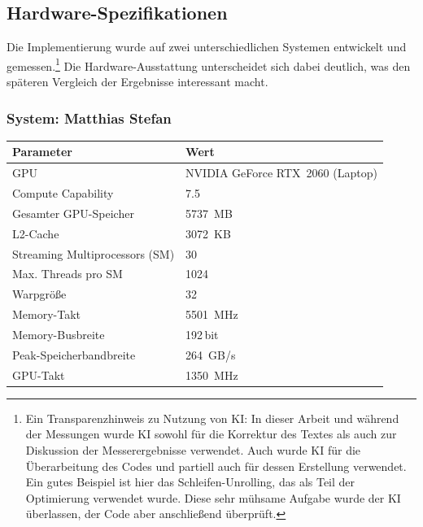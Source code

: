 \subsection{Hardware-Spezifikationen}
\label{subsec:heardware-spezifikationen}

Die Implementierung wurde auf zwei unterschiedlichen Systemen entwickelt und
gemessen.\footnote{Ein Transparenzhinweis zu Nutzung von KI: In dieser Arbeit und während der Messungen wurde KI sowohl für die Korrektur des Textes als auch zur Diskussion der Messerergebnisse verwendet. Auch wurde KI für die Überarbeitung des Codes und partiell auch für dessen Erstellung verwendet. Ein gutes Beispiel ist hier das Schleifen-Unrolling, das als Teil der Optimierung verwendet wurde. Diese sehr mühsame Aufgabe wurde der KI überlassen, der Code aber anschließend überprüft.} Die Hardware-Ausstattung unterscheidet sich dabei deutlich, was den
späteren Vergleich der Ergebnisse interessant macht.

\subsubsection*{System: Matthias Stefan}
\begin{center}
    \small
    \setlength{\tabcolsep}{6pt}
    \renewcommand{\arraystretch}{0.9}
    \begin{tabular}{ll}
        \toprule
        Parameter & Wert \\
        \midrule
        GPU                              & NVIDIA GeForce RTX~2060 (Laptop) \\
        Compute Capability               & 7.5 \\
        Gesamter GPU-Speicher            & \SI{5737}{MB} \\
        L2-Cache                         & \SI{3072}{KB} \\
        Streaming Multiprocessors (SM)   & 30 \\
        Max. Threads pro SM              & 1024 \\
        Warpgröße                        & 32 \\
        Memory-Takt                      & \SI{5501}{MHz} \\
        Memory-Busbreite                 & 192\,bit \\
        Peak-Speicherbandbreite          & \SI{264}{GB/s} \\
        GPU-Takt                         & \SI{1350}{MHz} \\
        \bottomrule
    \end{tabular}
\end{center}

